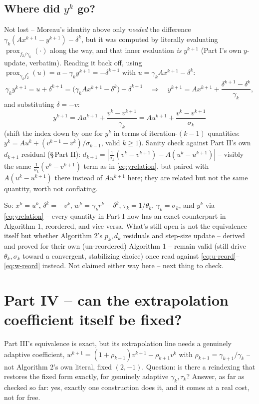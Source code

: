 \documentclass[11pt]{article}
\newcommand{\prox}{\operatorname{prox}}
\begin{document}
\subsection*{Where did $y^k$ go?}
Not lost -- Moreau's identity above only \emph{needed} the difference
$\gamma_k(Ax^{k+1}-y^{k+1})-\delta^k$, but it was computed by literally evaluating
$\prox_{f_2/\gamma_k}(\cdot)$ along the way, and that inner evaluation \emph{is}
$y^{k+1}$ (Part I's own $y$-update, verbatim). Reading it back off, using
$\prox_{\gamma_kf_2^*}(u)=u-\gamma_ky^{k+1}=-\delta^{k+1}$ with $u=\gamma_kAx^{k+1}-\delta^k$:
\[
\gamma_k y^{k+1} = u+\delta^{k+1} = \big(\gamma_kAx^{k+1}-\delta^k\big) + \delta^{k+1}
\quad\Longrightarrow\quad
y^{k+1} = Ax^{k+1} + \frac{\delta^{k+1}-\delta^k}{\gamma_k},
\]
and substituting $\delta=-v$:
\begin{equation}
\boxed{y^{k+1} = Au^{k+1} + \frac{v^k-v^{k+1}}{\gamma_k} = Au^{k+1}+\frac{v^k-v^{k+1}}{\sigma_k}} \label{eq:yrelation}
\end{equation}
(shift the index down by one for $y^k$ in terms of iteration-$(k-1)$ quantities:
$y^k=Au^k+(v^{k-1}-v^k)/\sigma_{k-1}$, valid $k\ge1$). Sanity check against Part II's own
$d_{k+1}$ residual (\S\,Part II): $d_{k+1}=|\tfrac1{\sigma_k}(v^k-v^{k+1})-A(u^k-u^{k+1})|$
-- visibly the same $\tfrac1{\sigma_k}(v^k-v^{k+1})$ term as in \eqref{eq:yrelation}, but
paired with $A(u^k-u^{k+1})$ there instead of $Au^{k+1}$ here; they are related but not
the same quantity, worth not conflating.

So: $x^k=u^k$, $\delta^k=-v^k$, $w^k=\gamma_kr^k-\delta^k$, $\tau_k=1/\theta_k$,
$\gamma_k=\sigma_k$, and $y^k$ via \eqref{eq:yrelation} --
every quantity in Part I now has an exact counterpart in Algorithm 1, reordered, and
vice versa. What's still open is not the equivalence itself but whether Algorithm 2's
$p_k,d_k$ residuals and step-size update -- derived and proved for their own
(un-reordered) Algorithm 1 -- remain valid (still drive $\theta_k,\sigma_k$ toward a
convergent, stabilizing choice) once read against \eqref{eq:u-reord}--\eqref{eq:w-reord}
instead. Not claimed either way here -- next thing to check.

\section*{Part IV -- can the extrapolation coefficient itself be fixed?}
Part III's equivalence is exact, but its extrapolation line needs a genuinely adaptive
coefficient, $w^{k+1}=(1+\rho_{k+1})v^{k+1}-\rho_{k+1}v^k$ with
$\rho_{k+1}=\gamma_{k+1}/\gamma_k$ -- not Algorithm 2's own literal, fixed $(2,-1)$.
Question: is there a reindexing that restores the fixed form exactly, for genuinely
adaptive $\gamma_k,\tau_k$? Answer, as far as checked so far: yes, exactly one
construction does it, and it comes at a real cost, not for free.
\end{document}
